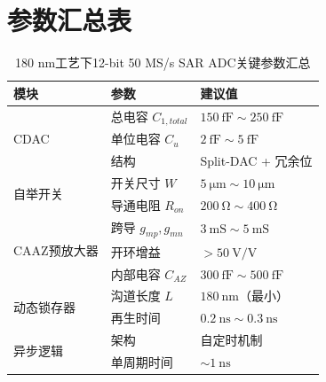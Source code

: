 \documentclass[11pt,a4paper,UTF8]{ctexart}
\begin{document}
\section{参数汇总表}

\begin{table}[htbp]
\centering
\caption{180 nm工艺下12-bit 50 MS/s SAR ADC关键参数汇总}
\label{tab:params}
\begin{tabular}{lll}
\toprule
\textbf{模块} & \textbf{参数} & \textbf{建议值} \\
\midrule
\multirow{3}{*}{CDAC} 
    & 总电容 $C_{1,total}$ & $\SI{150}{\femto\farad} \sim \SI{250}{\femto\farad}$ \\
    & 单位电容 $C_u$ & $\SI{2}{\femto\farad} \sim \SI{5}{\femto\farad}$ \\
    & 结构 & Split-DAC + 冗余位 \\
\midrule
\multirow{2}{*}{自举开关} 
    & 开关尺寸 $W$ & $\SI{5}{\micro\meter} \sim \SI{10}{\micro\meter}$ \\
    & 导通电阻 $R_{on}$ & $\SI{200}{\ohm} \sim \SI{400}{\ohm}$ \\
\midrule
\multirow{3}{*}{CAAZ预放大器} 
    & 跨导 $g_{mp}, g_{mn}$ & $\SI{3}{\milli\siemens} \sim \SI{5}{\milli\siemens}$ \\
    & 开环增益 & $> \SI{50}{\volt\per\volt}$ \\
    & 内部电容 $C_{AZ}$ & $\SI{300}{\femto\farad} \sim \SI{500}{\femto\farad}$ \\
\midrule
\multirow{2}{*}{动态锁存器} 
    & 沟道长度 $L$ & $\SI{180}{\nano\meter}$（最小） \\
    & 再生时间 & $\SI{0.2}{\nano\second} \sim \SI{0.3}{\nano\second}$ \\
\midrule
\multirow{2}{*}{异步逻辑} 
    & 架构 & 自定时机制 \\
    & 单周期时间 & $\sim\SI{1}{\nano\second}$ \\
\bottomrule
\end{tabular}
\end{table}
\end{document}

